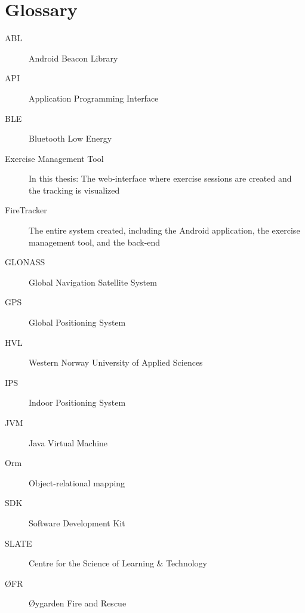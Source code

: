 \documentclass[../Main/thesis.tex]{subfiles}
\begin{document}
\chapter*{Glossary}
\begin{description}
\item[ABL] Android Beacon Library
\item[API] Application Programming Interface
\item[BLE] Bluetooth Low Energy
\item[Exercise Management Tool] In this thesis: The web-interface where exercise sessions are created and the tracking is visualized
\item[FireTracker] The entire system created, including the Android application, the exercise management tool, and the back-end
\item[GLONASS] Global Navigation Satellite System
\item[GPS] Global Positioning System
\item[HVL] Western Norway University of Applied Sciences
\item[IPS] Indoor Positioning System
\item[JVM] Java Virtual Machine
\item[Orm] Object-relational mapping 
\item[SDK] Software Development Kit
\item[SLATE] Centre for the Science of Learning \& Technology
\item[ØFR] Øygarden Fire and Rescue
\end{description}

\blankpage
\end{document}
